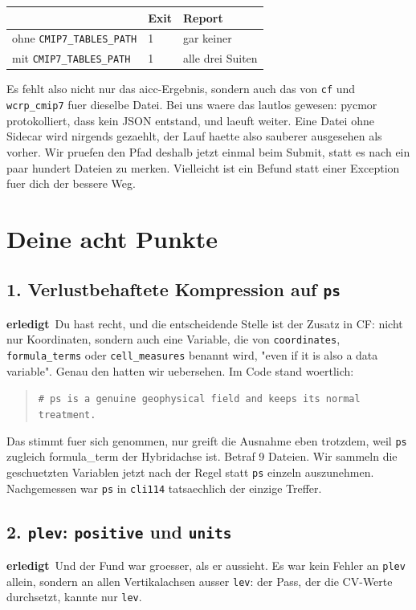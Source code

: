 \documentclass[11pt,a4paper]{article}
\newcommand{\code}[1]{\texttt{\small #1}}
\newcommand{\ok}{\textcolor{green!45!black}{\textbf{erledigt}}}
\begin{document}
\begin{center}
\begin{tabular}{lll}
\toprule
& \textbf{Exit} & \textbf{Report} \\
\midrule
ohne \code{CMIP7\_TABLES\_PATH} & 1 & gar keiner \\
mit \code{CMIP7\_TABLES\_PATH}  & 1 & alle drei Suiten \\
\bottomrule
\end{tabular}
\end{center}

Es fehlt also nicht nur das aicc-Ergebnis, sondern auch das von \code{cf} und
\code{wcrp\_cmip7} fuer dieselbe Datei. Bei uns waere das lautlos gewesen: pycmor
protokolliert, dass kein JSON entstand, und laeuft weiter. Eine Datei ohne Sidecar
wird nirgends gezaehlt, der Lauf haette also sauberer ausgesehen als vorher. Wir
pruefen den Pfad deshalb jetzt einmal beim Submit, statt es nach ein paar hundert
Dateien zu merken. Vielleicht ist ein Befund statt einer Exception fuer dich der
bessere Weg.

\section{Deine acht Punkte}

\subsection*{1. Verlustbehaftete Kompression auf \code{ps}}
\ok\ Du hast recht, und die entscheidende Stelle ist der Zusatz in CF: nicht nur
Koordinaten, sondern auch eine Variable, die von \code{coordinates},
\code{formula\_terms} oder \code{cell\_measures} benannt wird, "even if it is also a
data variable". Genau den hatten wir uebersehen. Im Code stand woertlich:

\begin{quote}
\code{\# ps is a genuine geophysical field and keeps its normal treatment.}
\end{quote}

Das stimmt fuer sich genommen, nur greift die Ausnahme eben trotzdem, weil \code{ps}
zugleich formula\_term der Hybridachse ist. Betraf 9 Dateien. Wir sammeln die
geschuetzten Variablen jetzt nach der Regel statt \code{ps} einzeln auszunehmen.
Nachgemessen war \code{ps} in \code{cli114} tatsaechlich der einzige Treffer.

\subsection*{2. \code{plev}: \code{positive} und \code{units}}
\ok\ Und der Fund war groesser, als er aussieht. Es war kein Fehler an \code{plev}
allein, sondern an allen Vertikalachsen ausser \code{lev}: der Pass, der die
CV-Werte durchsetzt, kannte nur \code{lev}.
\end{document}
